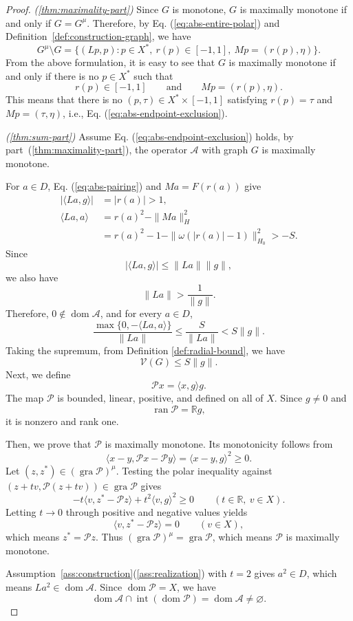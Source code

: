 \documentclass[11pt]{article}
\newcommand{\R}{\mathbb R}
\newcommand{\gra}{\operatorname{gra}}
\newcommand{\dom}{\operatorname{dom}}
\newcommand{\pair}[2]{\langle #1,#2\rangle}
\theoremstyle{definition}
\theoremstyle{remark}
\begin{document}
\begin{proof}
\noindent\textit{\textup{(\ref{thm:maximality-part})}}
Since $G$ is monotone, $G$ is maximally monotone if and only if $G=G^\mu$. Therefore, by Eq. (\ref{eq:abs-entire-polar}) and Definition~\ref{def:construction-graph}, we have 
\[
G^\mu\setminus G
=
\{(Lp,p):p\in X^*,\ r(p)\in[-1,1],\ Mp=(r(p),\eta)\}.
\]
From the above formulation, it is easy to see that $G$ is maximally monotone if and only if there is no $p\in X^*$ such that
\[
r(p)\in[-1,1]
\qquad\text{and}\qquad
Mp=(r(p),\eta).
\]
This means that there is no $(p,\tau)\in X^*\times[-1,1]$ satisfying 
$r(p)=\tau$ and $Mp=(\tau,\eta)$, i.e.,  Eq. (\ref{eq:abs-endpoint-exclusion}).






\noindent\textit{\textup{(\ref{thm:sum-part})}}
Assume Eq. (\ref{eq:abs-endpoint-exclusion}) holds, by
part~\textup{(\ref{thm:maximality-part})}, the operator $\mathcal A$
with graph $G$ is maximally monotone.

For $a\in D$, Eq. (\ref{eq:abs-pairing}) and $Ma=F(r(a))$ give
\[
\begin{aligned}
|\pair{La}{g}|&=|r(a)|>1,\\
\pair{La}{a}
&=r(a)^2-\|Ma\|_H^2\\
&=r(a)^2-1-\|\omega(|r(a)|-1)\|_{H_0}^2>-S.
\end{aligned}
\]
Since
\[
|\pair{La}{g}|\le \|La\|\|g\|,
\]
we also have
\[
\|La\|>\frac{1}{\|g\|}.
\]
Therefore, $0\notin\dom\mathcal A$, and for every $a\in D$,
\[
\frac{\max\{0,-\pair{La}{a}\}}{\|La\|}
\le
\frac{S}{\|La\|}
<
S\|g\|.
\]
Taking the supremum, from Definition \ref{def:radial-bound}, we have
\[
\mathcal V(G)\le S\|g\|.
\]
Next, we define
\[
\mathcal Px=\pair{x}{g}g.
\]
The map $\mathcal P$ is bounded, linear, positive, and defined on all
of $X$. Since $g\ne0$ and
\[
\operatorname{ran}\mathcal P=\R g,
\]
it is nonzero and rank one.

Then, we prove that $\mathcal P$ is maximally monotone. Its monotonicity
follows from
\[
\pair{x-y}{\mathcal Px-\mathcal Py}
=
\pair{x-y}{g}^2\ge0.
\]
Let $(z,z^*)\in(\gra\mathcal P)^\mu$. Testing the polar inequality
against $(z+tv,\mathcal P(z+tv))\in\gra\mathcal P$ gives
\[
-t\pair{v}{z^*-\mathcal Pz}
+t^2\pair{v}{g}^2\ge0
\qquad(t\in\R,\ v\in X).
\]
Letting $t\to0$ through positive and negative values yields
\[
\pair{v}{z^*-\mathcal Pz}=0
\qquad(v\in X),
\]
which means $z^*=\mathcal Pz$. 
Thus $(\gra\mathcal P)^\mu=\gra\mathcal P$, which means $\mathcal P$ is maximally
monotone. 

Assumption~\ref{ass:construction}\textup{(\ref{ass:realization})}
with $t=2$ gives $a^2\in D$, which means 
$La^2\in\dom\mathcal A$. Since $\dom\mathcal P=X$, we have 
\[
\dom\mathcal A\cap\operatorname{int}(\dom\mathcal P)
=
\dom\mathcal A\ne\varnothing.
\]


\end{proof}
\end{document}
